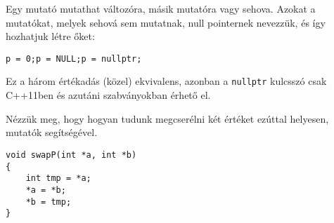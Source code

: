 \documentclass[a4paper,11.5pt,table]{article}
\begin{document}
	Egy mutató mutathat változóra, másik mutatóra vagy sehova. Azokat a mutatókat, melyek sehová sem mutatnak, null pointernek nevezzük, és így hozhatjuk létre őket:
	
	{\centering \texttt{p = 0;\quad \quad p = NULL;\quad \quad p = nullptr;} \par}
	
	\begin{note}
		Ez a három értékadás (közel) ekvivalens, azonban a \texttt{nullptr} kulcsszó csak C++11ben és azutáni szabványokban érhető el.
	\end{note}

  Nézzük meg, hogy hogyan tudunk megcserélni két értéket ezúttal helyesen, mutatók segítségével.
	
	\begin{lstlisting}
void swapP(int *a, int *b)
{
	int tmp = *a;
	*a = *b;
	*b = tmp;
}
	\end{lstlisting}
	
\end{document}
